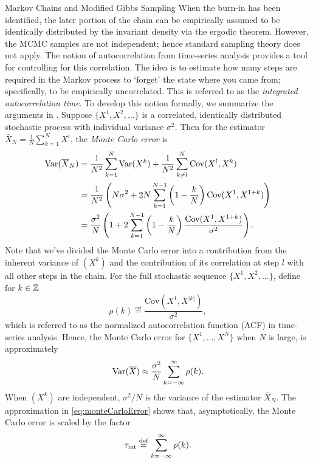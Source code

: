 \begin{chapter}{Markov Chains and Modified Gibbs Sampling}
When the burn-in has been identified, the later portion of the chain can be empirically assumed to be identically distributed by the invariant density via the ergodic theorem. 
However, the MCMC samples are not independent; hence standard sampling theory does not apply.
The notion of autocorrelation from time-series analysis provides a tool for controlling for this correlation.
The idea is to estimate how many steps are required in the Markov process to `forget' the state where you came from; specifically, to be empirically uncorrelated.
This is referred to as the \emph{integrated autocorrelation time}.
To develop this notion formally, we summarize the arguments in \citep{sokal1997monte}. 
Suppose $\{X^1,X^2,\dots\}$ is a correlated, identically distributed stochastic process with individual variance $\sigma^2$. 
Then for the estimator $\bar X_N=\frac1N\sum_{k=1}^NX^i$, the {\em Monte Carlo error} is  
\begin{align}
{\rm Var}(\bar X_N)
  &=\frac{1}{N^2}\sum_{k=1}^N{\rm Var}(X^k)+\frac{1}{N^2}\sum_{k\neq l}^N {\rm Cov}(X^l,X^k)\nonumber\\
  &=\frac{1}{N^2}\left(N\sigma^2+2N\sum_{k=1}^{N-1}\left(1-\frac{k}{N}\right){\rm Cov}(X^1,X^{1+k})\right)\nonumber\\
  &=\frac{\sigma^2}{N}\left(1+2\sum_{k=1}^{N-1}\left(1-\frac{k}{N}\right)\frac{{\rm Cov}(X^1,X^{1+k})}{\sigma^2}\right).
\end{align}
Note that we've divided the Monte Carlo error into a contribution from the inherent variance of $(X^k)$ and the contribution of its correlation at step $l$ with all other steps in the chain.
For the full stochastic sequence $\{X^1,X^2,\dots\}$, define for $k \in \Z$
\begin{equation}
  \rho(k) \eqdef \frac{\mathrm{Cov}(X^1, X^{|k|})}{\sigma^2},
\end{equation}
which is referred to as the normalized autocorrelation function (ACF) in time-series analysis.
Hence, the Monte Carlo error for $\{X^1,\dots,X^N\}$ when $N$ is large, is approximately 
\begin{equation} \label{eq:monteCarloError}
{\rm Var}(\bar X) \approx \frac{\sigma^2}{N}\sum_{k=-\infty}^\infty \rho(k).
\end{equation}
When $(X^k)$ are independent, $\sigma^2/N$ is the variance of the estimator $\bar X_N$.
The approximation in \eqref{eq:monteCarloError} shows that, asymptotically, the Monte Carlo error is scaled by the factor
\begin{equation}
  \tau_{\rm int}\eqdef \sum_{k=-\infty}^\infty \rho(k).

\end{equation}
\end{chapter}
